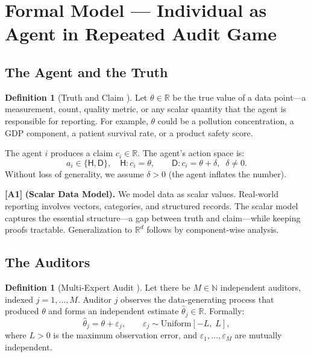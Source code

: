 \documentclass[11pt,a4paper]{article}
\theoremstyle{definition}
\newtheorem{definition}[theorem]{Definition}
\theoremstyle{remark}
\newcommand{\assumptionTag}[1]{\textsf{\textbf{[A#1]}}}
\newcommand{\R}{\mathbb{R}}
\newcommand{\N}{\mathbb{N}}
\newcommand{\honest}{\mathsf{H}}
\newcommand{\dishonest}{\mathsf{D}}
\newcommand{\claim}{c}
\newcommand{\truth}{\theta}
\newcommand{\deception}{\delta}
\newcommand{\tol}{L}
\begin{document}
\section{Formal Model --- Individual as Agent in Repeated Audit Game}
\label{sec:model}

\subsection{The Agent and the Truth }

\begin{definition}[Truth and Claim ]
\label{def:truth}
Let $\truth \in \R$ be the true value of a data point---a measurement, count, quality metric, or any scalar quantity that the agent is responsible for reporting. For example, $\truth$ could be a pollution concentration, a GDP component, a patient survival rate, or a product safety score.

The agent $i$ produces a claim $\claim_i \in \R$. The agent's action space is:
\begin{equation}
    a_i \in \{\honest, \dishonest\}, \quad
    \honest: \claim_i = \truth, \qquad
    \dishonest: \claim_i = \truth + \deception, \;\; \deception \neq 0.
\end{equation}
Without loss of generality, we assume $\deception > 0$ (the agent inflates the number).
\end{definition}

\assumptionTag{1} \textbf{(Scalar Data Model).} We model data as scalar values. Real-world reporting involves vectors, categories, and structured records. The scalar model captures the essential structure---a gap between truth and claim---while keeping proofs tractable. Generalization to $\R^d$ follows by component-wise analysis.

\subsection{The Auditors }

\begin{definition}[Multi-Expert Audit ]
\label{def:auditors}
Let there be $M \in \N$ independent auditors, indexed $j = 1, \dots, M$. Auditor $j$ observes the data-generating process that produced $\truth$ and forms an independent estimate $\hat{\theta}_j \in \R$. Formally:
\begin{equation}
    \hat{\theta}_j = \truth + \varepsilon_j, \qquad
    \varepsilon_j \sim \text{Uniform}[-\tol,\; \tol],
\end{equation}
where $\tol > 0$ is the maximum observation error, and $\varepsilon_1, \dots, \varepsilon_M$ are mutually independent.
\end{definition}
\end{document}
